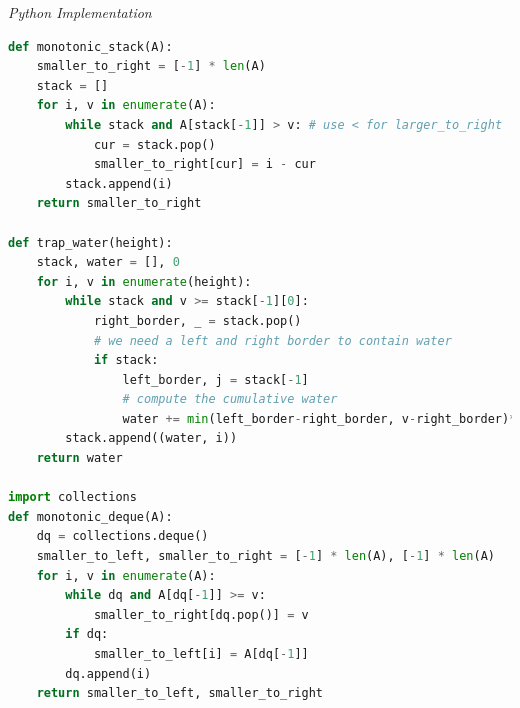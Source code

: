 \documentclass{article}
\begin{document}
\vspace{8pt} \emph{Python Implementation}
\begin{lstlisting}[language=Python]
def monotonic_stack(A):
    smaller_to_right = [-1] * len(A)
    stack = []
    for i, v in enumerate(A):
        while stack and A[stack[-1]] > v: # use < for larger_to_right
            cur = stack.pop()
            smaller_to_right[cur] = i - cur
        stack.append(i)
    return smaller_to_right

def trap_water(height):
    stack, water = [], 0
    for i, v in enumerate(height):
        while stack and v >= stack[-1][0]:
            right_border, _ = stack.pop()
            # we need a left and right border to contain water
            if stack:
                left_border, j = stack[-1]
                # compute the cumulative water
                water += min(left_border-right_border, v-right_border)*(i-j-1)
        stack.append((water, i))
    return water

import collections
def monotonic_deque(A):
    dq = collections.deque()
    smaller_to_left, smaller_to_right = [-1] * len(A), [-1] * len(A)
    for i, v in enumerate(A):
        while dq and A[dq[-1]] >= v: 
            smaller_to_right[dq.pop()] = v 
        if dq:  
            smaller_to_left[i] = A[dq[-1]]
        dq.append(i)
    return smaller_to_left, smaller_to_right
\end{lstlisting}
\end{document}
